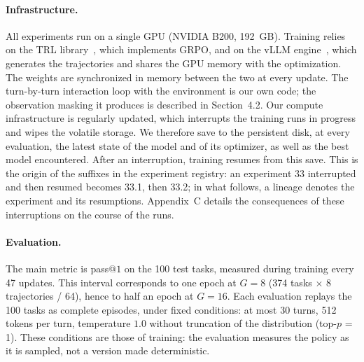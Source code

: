 \documentclass[11pt,a4paper]{article}
\begin{document}
\paragraph{Infrastructure.} All experiments run on a single GPU (NVIDIA B200, 192~GB). Training relies on the TRL library~\cite{vonwerra2020trl}, which implements GRPO, and on the vLLM engine~\cite{kwon2023vllm}, which generates the trajectories and shares the GPU memory with the optimization. The weights are synchronized in memory between the two at every update. The turn-by-turn interaction loop with the environment is our own code; the observation masking it produces is described in Section~4.2. Our compute infrastructure is regularly updated, which interrupts the training runs in progress and wipes the volatile storage. We therefore save to the persistent disk, at every evaluation, the latest state of the model and of its optimizer, as well as the best model encountered. After an interruption, training resumes from this save. This is the origin of the suffixes in the experiment registry: an experiment 33 interrupted and then resumed becomes 33.1, then 33.2; in what follows, a lineage denotes the experiment and its resumptions. Appendix~C details the consequences of these interruptions on the course of the runs.








\paragraph{Evaluation.} The main metric is pass@$1$ on the 100 test tasks, measured during training every 47 updates. This interval corresponds to one epoch at $G=8$ (374 tasks $\times$ 8 trajectories / 64), hence to half an epoch at $G=16$. Each evaluation replays the 100 tasks as complete episodes, under fixed conditions: at most 30 turns, 512 tokens per turn, temperature $1.0$ without truncation of the distribution (top-$p$ = 1). These conditions are those of training: the evaluation measures the policy as it is sampled, not a version made deterministic.
\end{document}
